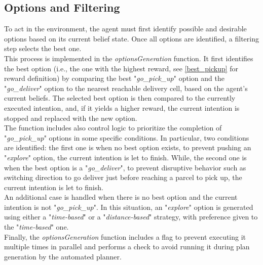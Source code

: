    \subsection{Options and Filtering}
        To act in the environment, the agent must first identify possible and desirable options based on its current belief state. Once all options are identified, a filtering step selects the best one.
        \medskip\\
        This process is implemented in the \textit{optionsGeneration} function. It first identifies the best option (i.e., the one with the highest reward, see \ref{best_pickup} for reward definition) by comparing the best "\textit{go\_pick\_up}" option and the "\textit{go\_deliver}" option to the nearest reachable delivery cell, based on the agent's current beliefs. The selected best option is then compared to the currently executed intention, and, if it yields a higher reward, the current intention is stopped and replaced with the new option.
        \medskip\\
        The function includes also control logic to prioritize the completion of "\textit{go\_pick\_up}" options in some specific conditions. In particular, two conditions are identified: the first one is when no best option exists, to prevent pushing an "\textit{explore}" option, the current intention is let to finish. While, the second one is when the best option is a "\textit{go\_deliver}", to prevent disruptive behavior such as switching direction to go deliver just before reaching a parcel to pick up, the current intention is let to finish.
        \medskip\\
        An additional case is handled when there is no best option and the current intention is not "\textit{go\_pick\_up}". In this situation, an "\textit{explore}" option is generated using either a "\textit{time-based}" or a "\textit{distance-based}" strategy, with preference given to the "\textit{time-based}" one.
        \medskip\\
        Finally, the \textit{optionsGeneration} function includes a flag to prevent executing it multiple times in parallel and performs a check to avoid running it during plan generation by the automated planner.
        
